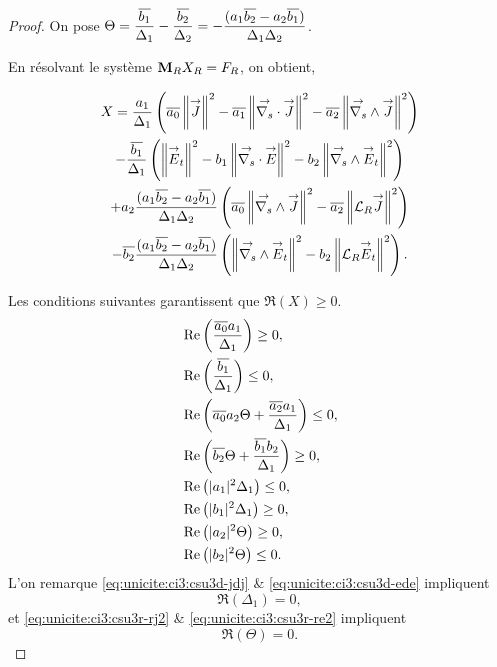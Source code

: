 \begin{proof}
    On pose \(\Theta=\dfrac{{\overline{b_1}}}{\Delta_1}-\dfrac{{\overline{b_2}}}{\Delta_2}=-\dfrac{(a_1{\overline{b_2}}-a_2{\overline{b_1}})}{\Delta_1\Delta_2}\).

      {En résolvant le système \(\mathbf{M}_RX_R=F_R\), on obtient},

      \begin{multline*}
        X =
        \dfrac{a_1}{\Delta_1}
        \left(
          {\overline{a_0}} \left\lVert{\overset{\rightarrow}{J}}\right\rVert^2 - {\overline{a_1}} \left\lVert{\overset{\rightarrow}{\nabla_s}} \cdot {\overset{\rightarrow}{J}}\right\rVert^2 - {\overline{a_2}} \left\lVert{\overset{\rightarrow}{\nabla_s}} \wedge {\overset{\rightarrow}{J}}\right\rVert^2
        \right)
        \\
        -\dfrac{{\overline{b_1}}}{\Delta_1}  
        \left(
          \left\lVert{\overset{\rightarrow}{E}}_t\right\rVert^2  - b_1 \left\lVert{\overset{\rightarrow}{\nabla_s}} \cdot {\overset{\rightarrow}{E}}\right\rVert^2  - b_2 \left\lVert{\overset{\rightarrow}{\nabla_s}} \wedge {\overset{\rightarrow}{E}}_t\right\rVert^2
        \right)
         \\
        + a_2\dfrac{(a_1{\overline{b_2}}-a_2{\overline{b_1}})}{\Delta_1\Delta_2}
        \left(
          {\overline{a_0}} \left\lVert{\overset{\rightarrow}{\nabla_s}} \wedge {\overset{\rightarrow}{J}}\right\rVert^2 - {\overline{a_2}} \left\lVert{\mathcal{L}_R} {\overset{\rightarrow}{J}}\right\rVert^2
        \right)
        \\
        -{\overline{b_2}}\dfrac{(a_1{\overline{b_2}}-a_2{\overline{b_1}})}{\Delta_1\Delta_2}
        \left(
          \left\lVert{\overset{\rightarrow}{\nabla_s}} \wedge {\overset{\rightarrow}{E}}_t\right\rVert^2 - {b_2} \left\lVert{\mathcal{L}_R} {\overset{\rightarrow}{E}}_t\right\rVert^2
        \right).
      \end{multline*}
      
      Les conditions suivantes garantissent que \(\Re(X)\ge 0\).
      \begin{align}
        \label{eq:unicite:ci3:csu3d-j2}&\operatorname{Re}\left(\dfrac{{\overline{a_0}}{a_1}}{\Delta_1}\right) \ge 0,
        \\
        \label{eq:unicite:ci3:csu3d-e2}&\operatorname{Re}\left(\dfrac{{\overline{b_1}}}{\Delta_1}\right) \le 0,
        \\
        \label{eq:unicite:ci3:csu3d-jrj}&\operatorname{Re}\left({\overline{a_0}}a_2\Theta + \dfrac{{\overline{a_2}}a_1}{\Delta_1} \right)\le 0,
        \\
        \label{eq:unicite:ci3:csu3d-ere}&\operatorname{Re}\left({\overline{b_2}}\Theta + \dfrac{{\overline{b_1}}b_2}{\Delta_1}\right) \ge 0,
        \\
        \label{eq:unicite:ci3:csu3d-jdj}&\operatorname{Re}\left(|a_1|^2\Delta_1\right) \le 0,
        \\
        \label{eq:unicite:ci3:csu3d-ede}&\operatorname{Re}\left(|b_1|^2\Delta_1\right) \ge 0,
        \\
        \label{eq:unicite:ci3:csu3d-dj2}&\operatorname{Re}\left(|a_2|^2\Theta\right)\ge 0,
        \\
        \label{eq:unicite:ci3:csu3d-de2}&\operatorname{Re}\left(|b_2|^2\Theta\right)\le 0.
      \end{align}
      L'on remarque \eqref{eq:unicite:ci3:csu3d-jdj} \& \eqref{eq:unicite:ci3:csu3d-ede} impliquent
      \begin{equation}
        \label{eq:unicite:ci3:csu3d-jde}
        \Re\left(\Delta_1\right) = 0,
      \end{equation}
      et \eqref{eq:unicite:ci3:csu3r-rj2} \& \eqref{eq:unicite:ci3:csu3r-re2} impliquent
      \begin{equation}
        \label{eq:unicite:ci3:csu3-rje2}
        \Re\left(\Theta\right) = 0.
      \end{equation}


\end{proof}
